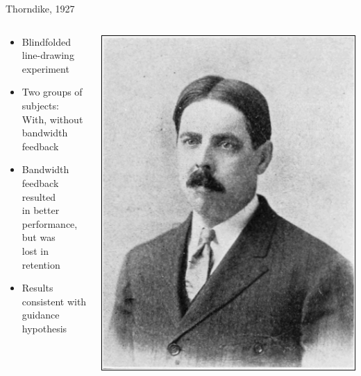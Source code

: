 \documentclass[10pt]{beamer}
\begin{document}
\begin{frame}[fragile]{Thorndike, 1927~\cite{thorndike1927law}}
  \begin{columns}[T]
    \begin{column}{.6\textwidth}
      \begin{itemize}
        \setlength\itemsep{1em}
        \item Blindfolded line-drawing experiment
        \item Two groups of subjects:\\ \quad With, without bandwidth feedback
        \item Bandwidth feedback resulted\\ in better performance, but was\\ lost in retention
        \item Results consistent with\\ guidance hypothesis
      \end{itemize}
    \end{column}
    \begin{column}{.4\textwidth}
      \includegraphics[width=\textwidth]{../img/thorndike.png}
    \end{column}
  \end{columns}
\end{frame}
\end{document}

